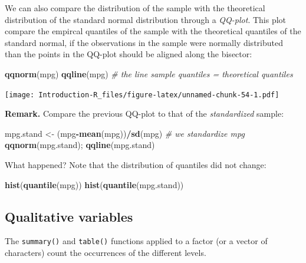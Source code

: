\documentclass[]{book}
\newenvironment{Shaded}{\begin{snugshade}}{\end{snugshade}}
\newcommand{\CommentTok}[1]{\textcolor[rgb]{0.56,0.35,0.01}{\textit{#1}}}
\newcommand{\KeywordTok}[1]{\textcolor[rgb]{0.13,0.29,0.53}{\textbf{#1}}}
\newcommand{\NormalTok}[1]{#1}
\newcommand{\OperatorTok}[1]{\textcolor[rgb]{0.81,0.36,0.00}{\textbf{#1}}}
\newcommand{\StringTok}[1]{\textcolor[rgb]{0.31,0.60,0.02}{#1}}
\begin{document}
We can also compare the distribution of the sample with the theoretical distribution of the standard normal distribution through a \emph{QQ-plot}. This plot compare the empircal quantiles of the sample with the theoretical quantiles of the standard normal, if the observations in the sample were normally distributed than the points in the QQ-plot should be aligned along the bisector:

\begin{Shaded}
\begin{Highlighting}[]
\KeywordTok{qqnorm}\NormalTok{(mpg)}
\KeywordTok{qqline}\NormalTok{(mpg) }\CommentTok{# the line sample quantiles = theoretical quantiles}
\end{Highlighting}
\end{Shaded}

\texttt{[image: Introduction-R\_files/figure-latex/unnamed-chunk-54-1.pdf]}

\textbf{Remark.} Compare the previous QQ-plot to that of the \emph{standardized} sample:

\begin{Shaded}
\begin{Highlighting}[]
\NormalTok{mpg.stand <-}\StringTok{ }\NormalTok{(mpg}\OperatorTok{-}\KeywordTok{mean}\NormalTok{(mpg))}\OperatorTok{/}\KeywordTok{sd}\NormalTok{(mpg) }\CommentTok{# we standardize mpg}
\KeywordTok{qqnorm}\NormalTok{(mpg.stand); }\KeywordTok{qqline}\NormalTok{(mpg.stand)}
\end{Highlighting}
\end{Shaded}

What happened? Note that the distribution of quantiles did not change:

\begin{Shaded}
\begin{Highlighting}[]
\KeywordTok{hist}\NormalTok{(}\KeywordTok{quantile}\NormalTok{(mpg))}
\KeywordTok{hist}\NormalTok{(}\KeywordTok{quantile}\NormalTok{(mpg.stand))}
\end{Highlighting}
\end{Shaded}

\hypertarget{qualitative-variables}{%
\subsection{Qualitative variables}\label{qualitative-variables}}

The \texttt{summary()} and \texttt{table()} functions applied to a factor (or a vector of characters) count the occurrences of the different levels.
\end{document}
